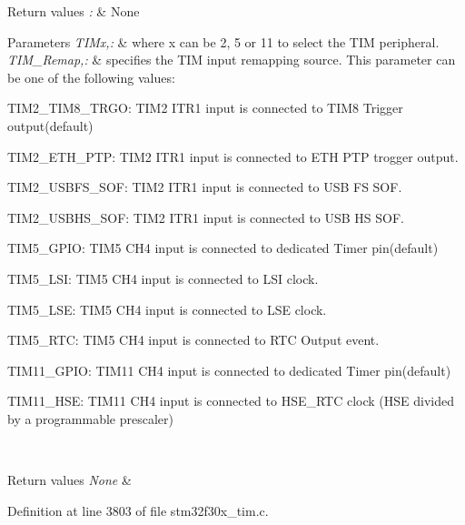 \begin{DoxyRetVals}{Return values}
{\em \-:} & None\\
\hline
\end{DoxyRetVals}

\begin{DoxyParams}{Parameters}
{\em T\-I\-Mx,\-:} & where x can be 2, 5 or 11 to select the T\-I\-M peripheral. \\
\hline
{\em T\-I\-M\-\_\-\-Remap,\-:} & specifies the T\-I\-M input remapping source. This parameter can be one of the following values\-: \begin{DoxyItemize}
\item T\-I\-M2\-\_\-\-T\-I\-M8\-\_\-\-T\-R\-G\-O\-: T\-I\-M2 I\-T\-R1 input is connected to T\-I\-M8 Trigger output(default) \item T\-I\-M2\-\_\-\-E\-T\-H\-\_\-\-P\-T\-P\-: T\-I\-M2 I\-T\-R1 input is connected to E\-T\-H P\-T\-P trogger output. \item T\-I\-M2\-\_\-\-U\-S\-B\-F\-S\-\_\-\-S\-O\-F\-: T\-I\-M2 I\-T\-R1 input is connected to U\-S\-B F\-S S\-O\-F. \item T\-I\-M2\-\_\-\-U\-S\-B\-H\-S\-\_\-\-S\-O\-F\-: T\-I\-M2 I\-T\-R1 input is connected to U\-S\-B H\-S S\-O\-F. \item T\-I\-M5\-\_\-\-G\-P\-I\-O\-: T\-I\-M5 C\-H4 input is connected to dedicated Timer pin(default) \item T\-I\-M5\-\_\-\-L\-S\-I\-: T\-I\-M5 C\-H4 input is connected to L\-S\-I clock. \item T\-I\-M5\-\_\-\-L\-S\-E\-: T\-I\-M5 C\-H4 input is connected to L\-S\-E clock. \item T\-I\-M5\-\_\-\-R\-T\-C\-: T\-I\-M5 C\-H4 input is connected to R\-T\-C Output event. \item T\-I\-M11\-\_\-\-G\-P\-I\-O\-: T\-I\-M11 C\-H4 input is connected to dedicated Timer pin(default) \item T\-I\-M11\-\_\-\-H\-S\-E\-: T\-I\-M11 C\-H4 input is connected to H\-S\-E\-\_\-\-R\-T\-C clock (H\-S\-E divided by a programmable prescaler) \end{DoxyItemize}
\\
\hline
\end{DoxyParams}

\begin{DoxyRetVals}{Return values}
{\em None} & \\
\hline
\end{DoxyRetVals}


Definition at line 3803 of file stm32f30x\-\_\-tim.\-c.

